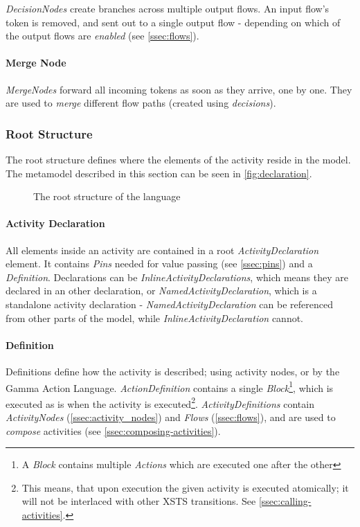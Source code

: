 \emph{DecisionNodes} create branches across multiple output flows. An input flow's token is removed, and sent out to a single output flow - depending on which of the output flows are \emph{enabled} (see \autoref{ssec:flows}).

\paragraph{Merge Node}

\emph{MergeNodes} forward all incoming tokens as soon as they arrive, one by one. They are used to \emph{merge} different flow paths (created using \emph{decisions}).

\subsubsection*{Root Structure}\label{ssec:root_structure}

The root structure defines where the elements of the activity reside in the model. The metamodel described in this section can be seen in \autoref{fig:declaration}.

\begin{figure}[!ht]
	\centering
	
	\caption{The root structure of the language}
	\label{fig:declaration}
\end{figure}

\paragraph{Activity Declaration}\label{par:activity_declaration}

All elements inside an activity are contained in a root \emph{ActivityDeclaration} element. It contains \emph{Pins} needed for value passing (see \autoref{ssec:pins}) and a \emph{Definition}. Declarations can be \emph{InlineActivityDeclarations}, which means they are declared in an other declaration, or \emph{NamedActivityDeclaration}, which is a standalone activity declaration - \emph{NamedActivityDeclaration} can be referenced from other parts of the model, while \emph{InlineActivityDeclaration} cannot.

\paragraph{Definition}\label{par:definition}

Definitions define how the activity is described; using activity nodes, or by the Gamma Action Language. \emph{ActionDefinition} contains a single \emph{Block}\footnote{A \emph{Block} contains multiple \emph{Actions} which are executed one after the other}, which is executed as is when the activity is executed\footnote{This means, that upon execution the given activity is executed atomically; it will not be interlaced with other XSTS transitions. See \autoref{ssec:calling-activities}.}. \emph{ActivityDefinitions} contain \emph{ActivityNodes} (\autoref{ssec:activity_nodes}) and \emph{Flows} (\autoref{ssec:flows}), and are used to \emph{compose} activities (see \autoref{ssec:composing-activities}).

